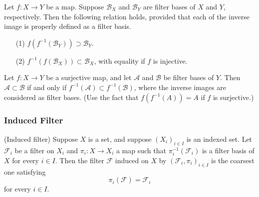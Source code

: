 \documentclass{report}
\begin{document}
\begin{exe}\label{double mapping}
    Let \( f:X \to Y \) be a map. Suppose \( \mathscr{B}_X \) and \( \mathscr{B}_Y \) are filter bases of \( X \) and \( Y \), respectively.
    Then the following relation holds, provided that each of the inverse image is properly defined as a filter basis.
    \begin{itemize}
        \item[(1)] \( f(f^{-1}(\mathscr{B}_Y)) \supset \mathscr{B}_Y \).
        \item[(2)] \( f^{-1}(f(\mathscr{B}_X)) \subset  \mathscr{B}_X \), with equality if \( f \) is injective.
    \end{itemize}
\end{exe}

\begin{exe}\label{inverse image preserve order}
    Let \( f:X \to Y \) be a surjective map, and let \( \mathscr{A} \) and \( \mathscr{B} \) be filter bases of \( Y \). Then \( \mathscr{A} \subset \mathscr{B} \) if and only if \( f^{-1}(\mathscr{A}) \subset f^{-1}(\mathscr{B}) \), where the inverse images are considered as filter bases. (Use the fact that \( f(f^{-1}(A)) =A \) if \( f \) is surjective.)
\end{exe}



\subsubsection{Induced Filter}

\begin{dfn} (Induced filter)
    Suppose \( X \) is a set, and suppose \( (X_i)_{i \in I} \) is an indexed set. Let \( \mathscr{F}_i \) be a filter on \( X_i \) and \( \pi_i:X \to X_i \) a map such that \( \pi_i ^{-1}(\mathscr{F}_i) \) is a filter basis of \( X \) for every \( i \in I \). Then the filter \( \mathscr{F} \) induced on \( X \) by \( (\mathscr{F}_i ,\pi_i)_{i \in I} \) is the coarsest one satisfying
    \begin{equation*}
        \pi_i(\mathscr{F}) = \mathscr{F}_i
    \end{equation*}
    for every \( i \in I \).
\end{dfn}
\end{document}
